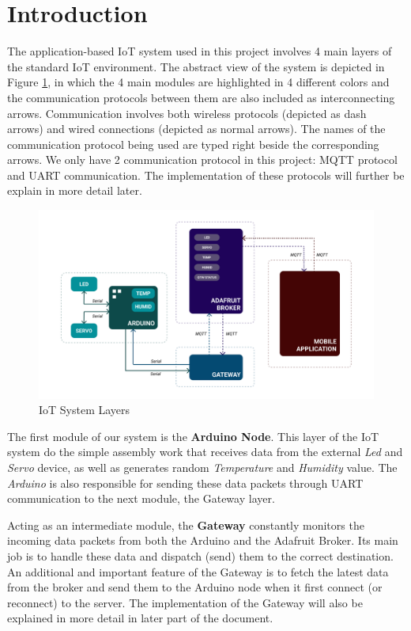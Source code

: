 \section{Introduction}
The application-based IoT system used in this project involves 4 main layers of the standard IoT environment. The abstract view of the system is depicted in Figure \ref{fig:iot-system}, in which the 4 main modules are highlighted in 4 different colors and the communication protocols between them are also included as interconnecting arrows. Communication involves both wireless protocols (depicted as dash arrows) and wired connections (depicted as normal arrows). The names of the communication protocol being used are typed right beside the corresponding arrows. We only have 2 communication protocol in this project: MQTT protocol and UART communication. The implementation of these protocols will further be explain in more detail later.
\begin{figure}
    \centering
    \includegraphics[scale=0.25]{graphics/Overall Architecture.png}
    \caption{IoT System Layers}
    \label{fig:iot-system}
\end{figure}

The first module of our system is the \textbf{Arduino Node}. This layer of the IoT system do the simple assembly work that receives data from the external \textit{Led} and \textit{Servo} device, as well as generates random \textit{Temperature} and \textit{Humidity} value. The \textit{Arduino} is also responsible for sending these data packets through UART communication to the next module, the Gateway layer.

Acting as an intermediate module, the \textbf{Gateway} constantly monitors the incoming data packets from both the Arduino and the Adafruit Broker. Its main job is to handle these data and dispatch (send) them to the correct destination. An additional and important feature of the Gateway is to fetch the latest data from the broker and send them to the Arduino node when it first connect (or reconnect) to the server. The implementation of the Gateway will also be explained in more detail in later part of the document.

